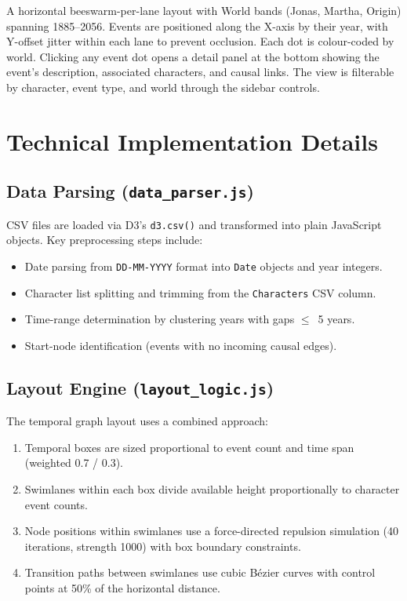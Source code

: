 \documentclass[11pt,a4paper]{article}
\begin{document}
A horizontal beeswarm-per-lane layout with World bands (Jonas, Martha, Origin) spanning 1885--2056. Events are positioned along the X-axis by their year, with Y-offset jitter within each lane to prevent occlusion. Each dot is colour-coded by world. Clicking any event dot opens a detail panel at the bottom showing the event's description, associated characters, and causal links. The view is filterable by character, event type, and world through the sidebar controls.

\section{Technical Implementation Details}

\subsection{Data Parsing (\texttt{data\_parser.js})}
CSV files are loaded via D3's \texttt{d3.csv()} and transformed into plain JavaScript objects. Key preprocessing steps include:
\begin{itemize}[nosep]
    \item Date parsing from \texttt{DD-MM-YYYY} format into \texttt{Date} objects and year integers.
    \item Character list splitting and trimming from the \texttt{Characters} CSV column.
    \item Time-range determination by clustering years with gaps $\leq$~5 years.
    \item Start-node identification (events with no incoming causal edges).
\end{itemize}

\subsection{Layout Engine (\texttt{layout\_logic.js})}
The temporal graph layout uses a combined approach:
\begin{enumerate}[nosep]
    \item Temporal boxes are sized proportional to event count and time span (weighted 0.7 / 0.3).
    \item Swimlanes within each box divide available height proportionally to character event counts.
    \item Node positions within swimlanes use a force-directed repulsion simulation (40 iterations, strength 1000) with box boundary constraints.
    \item Transition paths between swimlanes use cubic B\'{e}zier curves with control points at 50\% of the horizontal distance.
\end{enumerate}
\end{document}
